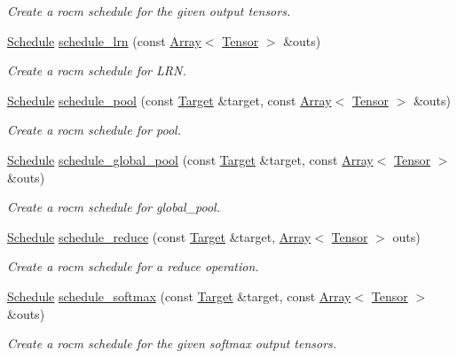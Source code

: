 \begin{DoxyCompactItemize}
\begin{DoxyCompactList}\small\item\em Create a rocm schedule for the given output tensors. \end{DoxyCompactList}\item 
\hyperlink{classtvm_1_1te_1_1Schedule}{Schedule} \hyperlink{namespacetopi_1_1rocm_a59eae2bcfcaab137309bfa39160abe4d}{schedule\+\_\+lrn} (const \hyperlink{classtvm_1_1Array}{Array}$<$ \hyperlink{classtvm_1_1te_1_1Tensor}{Tensor} $>$ \&outs)
\begin{DoxyCompactList}\small\item\em Create a rocm schedule for L\+RN. \end{DoxyCompactList}\item 
\hyperlink{classtvm_1_1te_1_1Schedule}{Schedule} \hyperlink{namespacetopi_1_1rocm_aeee58cb226b8c2dd216ea35734015c52}{schedule\+\_\+pool} (const \hyperlink{classtvm_1_1Target}{Target} \&target, const \hyperlink{classtvm_1_1Array}{Array}$<$ \hyperlink{classtvm_1_1te_1_1Tensor}{Tensor} $>$ \&outs)
\begin{DoxyCompactList}\small\item\em Create a rocm schedule for pool. \end{DoxyCompactList}\item 
\hyperlink{classtvm_1_1te_1_1Schedule}{Schedule} \hyperlink{namespacetopi_1_1rocm_a77d9f533a273599910a7369802d46331}{schedule\+\_\+global\+\_\+pool} (const \hyperlink{classtvm_1_1Target}{Target} \&target, const \hyperlink{classtvm_1_1Array}{Array}$<$ \hyperlink{classtvm_1_1te_1_1Tensor}{Tensor} $>$ \&outs)
\begin{DoxyCompactList}\small\item\em Create a rocm schedule for global\+\_\+pool. \end{DoxyCompactList}\item 
\hyperlink{classtvm_1_1te_1_1Schedule}{Schedule} \hyperlink{namespacetopi_1_1rocm_ab723607763d527d439a68a9c6304a4cd}{schedule\+\_\+reduce} (const \hyperlink{classtvm_1_1Target}{Target} \&target, \hyperlink{classtvm_1_1Array}{Array}$<$ \hyperlink{classtvm_1_1te_1_1Tensor}{Tensor} $>$ outs)
\begin{DoxyCompactList}\small\item\em Create a rocm schedule for a reduce operation. \end{DoxyCompactList}\item 
\hyperlink{classtvm_1_1te_1_1Schedule}{Schedule} \hyperlink{namespacetopi_1_1rocm_a7492948479b9832cb5c10610628df529}{schedule\+\_\+softmax} (const \hyperlink{classtvm_1_1Target}{Target} \&target, const \hyperlink{classtvm_1_1Array}{Array}$<$ \hyperlink{classtvm_1_1te_1_1Tensor}{Tensor} $>$ \&outs)
\begin{DoxyCompactList}\small\item\em Create a rocm schedule for the given softmax output tensors. \end{DoxyCompactList}\end{DoxyCompactItemize}


